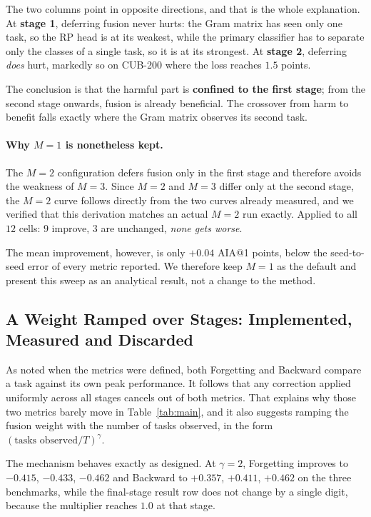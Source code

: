 \documentclass[11pt,a4paper]{article}
\begin{document}
The two columns point in opposite directions, and that is the whole explanation.
At \textbf{stage 1}, deferring fusion never hurts: the Gram matrix has seen only
one task, so the RP head is at its weakest, while the primary classifier has to
separate only the classes of a single task, so it is at its strongest. At
\textbf{stage 2}, deferring \emph{does} hurt, markedly so on CUB-200 where the
loss reaches $1.5$ points.

The conclusion is that the harmful part is \textbf{confined to the first stage};
from the second stage onwards, fusion is already beneficial. The crossover from
harm to benefit falls exactly where the Gram matrix observes its second task.

\paragraph{Why $M = 1$ is nonetheless kept.}
The $M = 2$ configuration defers fusion only in the first stage and therefore
avoids the weakness of $M = 3$. Since $M = 2$ and $M = 3$ differ only at the
second stage, the $M = 2$ curve follows directly from the two curves already
measured, and we verified that this derivation matches an actual $M = 2$ run
exactly. Applied to all $12$ cells: $9$ improve, $3$ are unchanged, \emph{none
gets worse}.

The mean improvement, however, is only $+0.04$ AIA@1 points, below the
seed-to-seed error of every metric reported. We therefore keep $M = 1$ as the
default and present this sweep as an analytical result, not a change to the
method.

\subsection{A Weight Ramped over Stages: Implemented, Measured and Discarded}
\label{sec:ramp}

As noted when the metrics were defined, both Forgetting and Backward compare a
task against its own peak performance. It follows that any correction applied
uniformly across all stages cancels out of both metrics. That explains why those
two metrics barely move in Table~\ref{tab:main}, and it also suggests ramping the
fusion weight with the number of tasks observed, in the form
$(\text{tasks observed}/T)^{\gamma}$.

The mechanism behaves exactly as designed. At $\gamma = 2$, Forgetting improves
to $-0.415$, $-0.433$, $-0.462$ and Backward to $+0.357$, $+0.411$, $+0.462$ on
the three benchmarks, while the final-stage result row does not change by a
single digit, because the multiplier reaches $1.0$ at that stage.
\end{document}
